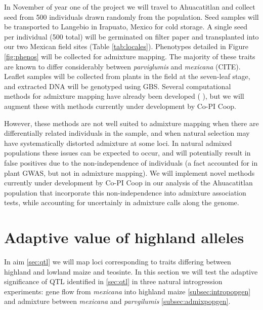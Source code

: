 In November of year one of the project we will travel to Ahuacatitlan and collect seed from 500 individuals drawn randomly from the population.  Seed samples will be transported to Langebio in Irapuato, Mexico for cold storage. A single seed per individual (500 total) will be germinated on filter paper and transplanted into our two Mexican field sites (Table \ref{tab:locales}).  Phenotypes detailed in Figure \ref{fig:phenos} will be collected for admixture mapping.  The majority of these traits are known to differ considerably between \emph{parviglumis} and \emph{mexicana} (CITE).  Leaflet samples will be collected from plants in the field at the seven-leaf stage, and extracted DNA will be genotyped using GBS.  Several computational methods for admixture mapping have already been developed (  \citet{winkler2010admixture}), but we will augment these with methods currently under development by Co-PI Coop.  

However, these methods are not well suited to admixture mapping when there are differentially related individuals in the sample, and when natural selection may have systematically distorted admixture at some loci. In natural admixed populations these issues can be expected to occur, and will potentially result in false positives due to the non-independence of individuals (a fact accounted for in plant GWAS, but not in admixture mapping). We will implement novel methods currently under development by Co-PI Coop in our analysis of the Ahuacatitlan population that incorporate this non-independence into admixture association tests, while accounting for uncertainly in admixture calls along the genome. 


\section{Adaptive value of highland alleles} \label{sec:selection}

In aim \ref{sec:qtl} we will map loci corresponding to traits differing between highland and lowland maize and teosinte. In this section we will test the adaptive significance of QTL identified in \ref{sec:qtl} in three natural introgression experiments: gene flow from \emph{mexicana} into highland maize \ref{subsec:intropopgen} and admixture between \emph{mexicana} and \emph{parvgilumis} \ref{subsec:admixpopgen}. 

